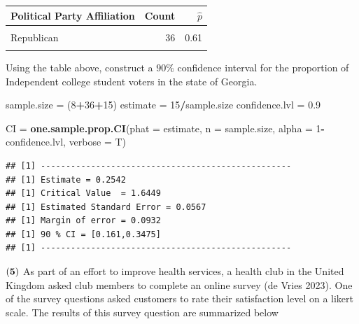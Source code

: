 \documentclass[
]{article}
\newenvironment{Shaded}{\begin{snugshade}}{\end{snugshade}}
\newcommand{\AttributeTok}[1]{\textcolor[rgb]{0.13,0.29,0.53}{#1}}
\newcommand{\DecValTok}[1]{\textcolor[rgb]{0.00,0.00,0.81}{#1}}
\newcommand{\FloatTok}[1]{\textcolor[rgb]{0.00,0.00,0.81}{#1}}
\newcommand{\FunctionTok}[1]{\textcolor[rgb]{0.13,0.29,0.53}{\textbf{#1}}}
\newcommand{\NormalTok}[1]{#1}
\newcommand{\OtherTok}[1]{\textcolor[rgb]{0.56,0.35,0.01}{#1}}
\newcommand{\SpecialCharTok}[1]{\textcolor[rgb]{0.81,0.36,0.00}{\textbf{#1}}}
\begin{document}
\begin{table}[H]
\centering\centering
\begin{tabular}{lrr}
\toprule
Political Party Affiliation & Count & $\hat{p}$\\
\midrule
\cellcolor{gray!10}{Democrat} & \cellcolor{gray!10}{8} & \cellcolor{gray!10}{0.14}\\
Republican & 36 & 0.61\\
\cellcolor{gray!10}{Independent} & \cellcolor{gray!10}{15} & \cellcolor{gray!10}{0.25}\\
\bottomrule
\end{tabular}
\end{table}

Using the table above, construct a \(90\%\) confidence interval for the
proportion of Independent college student voters in the state of
Georgia.

\begin{Shaded}
\begin{Highlighting}[]
\NormalTok{sample.size }\OtherTok{=}\NormalTok{ (}\DecValTok{8}\SpecialCharTok{+}\DecValTok{36}\SpecialCharTok{+}\DecValTok{15}\NormalTok{)}
\NormalTok{estimate }\OtherTok{=} \DecValTok{15}\SpecialCharTok{/}\NormalTok{sample.size}
\NormalTok{confidence.lvl }\OtherTok{=} \FloatTok{0.9}

\NormalTok{CI }\OtherTok{=} \FunctionTok{one.sample.prop.CI}\NormalTok{(}\AttributeTok{phat =}\NormalTok{ estimate, }
                        \AttributeTok{n =}\NormalTok{ sample.size, }
                        \AttributeTok{alpha =} \DecValTok{1}\SpecialCharTok{{-}}\NormalTok{confidence.lvl, }
                        \AttributeTok{verbose =}\NormalTok{ T)}
\end{Highlighting}
\end{Shaded}

\begin{verbatim}
## [1] --------------------------------------------------
## [1] Estimate = 0.2542
## [1] Critical Value  = 1.6449
## [1] Estimated Standard Error = 0.0567
## [1] Margin of error = 0.0932
## [1] 90 % CI = [0.161,0.3475]
## [1] --------------------------------------------------
\end{verbatim}

\(\bf (5)\) As part of an effort to improve health services, a health
club in the United Kingdom asked club members to complete an online
survey (de Vries 2023). One of the survey questions asked customers to
rate their satisfaction level on a likert scale. The results of this
survey question are summarized below
\end{document}
